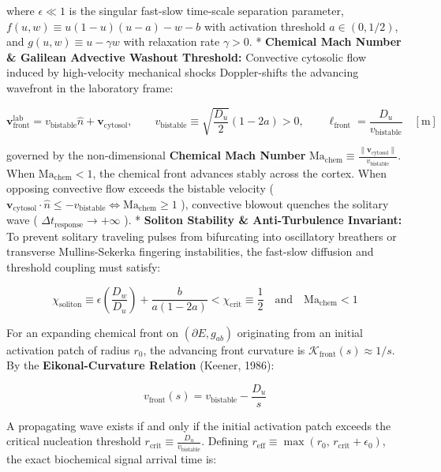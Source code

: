 \documentclass[11pt,a4paper]{article}
\theoremstyle{definition}
\theoremstyle{remark}
\begin{document}
where $\epsilon \ll 1$ is the singular fast-slow time-scale separation parameter, $f(u, w) \equiv u(1-u)(u - a) - w - b$ with activation threshold $a \in (0, 1/2)$, and $g(u, w) \equiv u - \gamma w$ with relaxation rate $\gamma > 0$.
* \textbf{Chemical Mach Number \& Galilean Advective Washout Threshold:} Convective cytosolic flow induced by high-velocity mechanical shocks Doppler-shifts the advancing wavefront in the laboratory frame:


\begin{equation}
\mathbf{v}_{\text{front}}^{\text{lab}} = v_{\text{bistable}} \hat{n} + \mathbf{v}_{\text{cytosol}}, \qquad v_{\text{bistable}} \equiv \sqrt{\frac{D_u}{2}}(1 - 2a) > 0, \qquad \ell_{\text{front}} = \frac{D_u}{v_{\text{bistable}}} \quad [\mathrm{m}]
\end{equation}


governed by the non-dimensional \textbf{Chemical Mach Number} $\mathrm{Ma}_{\text{chem}} \equiv \frac{\|\mathbf{v}_{\text{cytosol}}\|}{v_{\text{bistable}}}$. When $\mathrm{Ma}_{\text{chem}} < 1$, the chemical front advances stably across the cortex. When opposing convective flow exceeds the bistable velocity ( $\mathbf{v}_{\text{cytosol}} \cdot \hat{n} \le -v_{\text{bistable}} \iff \mathrm{Ma}_{\text{chem}} \ge 1$ ), convective blowout quenches the solitary wave ( $\Delta t_{\text{response}} \to +\infty$ ).
* \textbf{Soliton Stability \& Anti-Turbulence Invariant:} To prevent solitary traveling pulses from bifurcating into oscillatory breathers or transverse Mullins-Sekerka fingering instabilities, the fast-slow diffusion and threshold coupling must satisfy:


\begin{equation}
\boxed{\chi_{\text{soliton}} \equiv \epsilon \left( \frac{D_w}{D_u} \right) + \frac{b}{a(1 - 2a)} < \chi_{\text{crit}} \equiv \frac{1}{2} \quad \text{and} \quad \mathrm{Ma}_{\text{chem}} < 1}
\end{equation}


For an expanding chemical front on $(\partial E, g_{ab})$ originating from an initial activation patch of radius $r_0$, the advancing front curvature is $\mathcal{K}_{\text{front}}(s) \approx 1/s$. By the \textbf{Eikonal-Curvature Relation} (Keener, 1986):


\begin{equation}
v_{\text{front}}(s) = v_{\text{bistable}} - \frac{D_u}{s}
\end{equation}


A propagating wave exists if and only if the initial activation patch exceeds the critical nucleation threshold $r_{\text{crit}} \equiv \frac{D_u}{v_{\text{bistable}}}$. Defining $r_{\text{eff}} \equiv \max(r_0, \, r_{\text{crit}} + \epsilon_0)$, the exact biochemical signal arrival time is:
\end{document}
